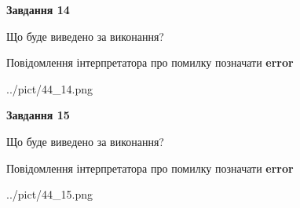 \documentclass[11pt, ukrainian]{article}
\begin{document}
{\begin {large}
{\begin {center}\textbf{Завдання 14}\end {center}}\par
Що буде виведено за виконання? \par
Повідомлення інтерпретатора про помилку позначати \textbf{error}

\begin{center}
	{../pict/44_14.png}
\end{center}
\newpage

{\begin {center}\textbf{Завдання 15}\end {center}}\par
Що буде виведено за виконання? \par
Повідомлення інтерпретатора про помилку позначати \textbf{error}

\begin{center}
	{../pict/44_15.png}
\end{center}
\newpage

\end {large}}
\end{document}
